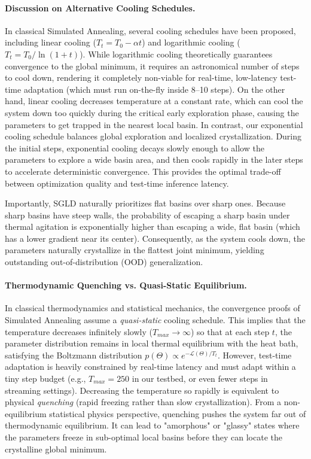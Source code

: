 \paragraph{Discussion on Alternative Cooling Schedules.} In classical Simulated Annealing, several cooling schedules have been proposed, including linear cooling ($T_t = T_0 - \alpha t$) and logarithmic cooling ($T_t = T_0 / \ln(1 + t)$).
While logarithmic cooling theoretically guarantees convergence to the global minimum, it requires an astronomical number of steps to cool down, rendering it completely non-viable for real-time, low-latency test-time adaptation (which must run on-the-fly inside 8--10 steps).
On the other hand, linear cooling decreases temperature at a constant rate, which can cool the system down too quickly during the critical early exploration phase, causing the parameters to get trapped in the nearest local basin.
In contrast, our exponential cooling schedule balances global exploration and localized crystallization.
During the initial steps, exponential cooling decays slowly enough to allow the parameters to explore a wide basin area, and then cools rapidly in the later steps to accelerate deterministic convergence.
This provides the optimal trade-off between optimization quality and test-time inference latency.

Importantly, SGLD naturally prioritizes flat basins over sharp ones.
Because sharp basins have steep walls, the probability of escaping a sharp basin under thermal agitation is exponentially higher than escaping a wide, flat basin (which has a lower gradient near its center).
Consequently, as the system cools down, the parameters naturally crystallize in the flattest joint minimum, yielding outstanding out-of-distribution (OOD) generalization.

\paragraph{Thermodynamic Quenching vs. Quasi-Static Equilibrium.} In classical thermodynamics and statistical mechanics, the convergence proofs of Simulated Annealing assume a \emph{quasi-static} cooling schedule.
This implies that the temperature decreases infinitely slowly ($T_{max} \to \infty$) so that at each step $t$, the parameter distribution remains in local thermal equilibrium with the heat bath, satisfying the Boltzmann distribution $p(\Theta) \propto e^{-\mathcal{L}(\Theta)/T_t}$.
However, test-time adaptation is heavily constrained by real-time latency and must adapt within a tiny step budget (e.g., $T_{max} = 250$ in our testbed, or even fewer steps in streaming settings).
Decreasing the temperature so rapidly is equivalent to physical \emph{quenching} (rapid freezing rather than slow crystallization).
From a non-equilibrium statistical physics perspective, quenching pushes the system far out of thermodynamic equilibrium.
It can lead to "amorphous" or "glassy" states where the parameters freeze in sub-optimal local basins before they can locate the crystalline global minimum.

